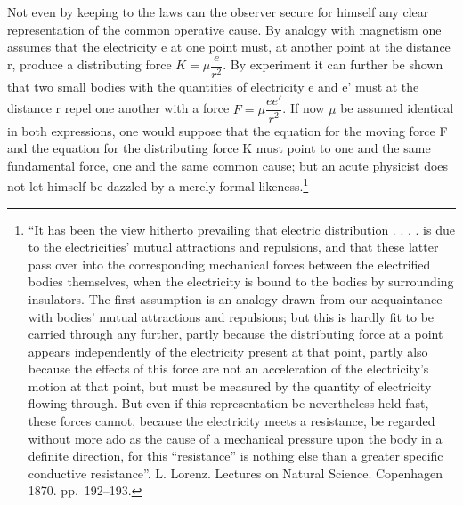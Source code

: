 \documentclass[12pt,a4paper]{book}
\begin{document}
Not even by keeping to the laws can the observer secure for himself any clear representation of the common operative
cause. By analogy with magnetism one assumes that the electricity e at one point must, at another
point at the distance r, produce a distributing force $K = \mu \dfrac{e}{r^{2}}$. By experiment it can further be shown
that two small bodies with the
quantities of electricity e and e' must at the distance r repel one another
with a force $F = \mu \dfrac{ee'}{r^{2}}$. If now $\mu$ be assumed identical in both expressions, one would suppose that
the equation for the moving force F and the equation for the distributing force K must point to one and the same
fundamental force, one and the same common cause; but an acute physicist does not let himself be dazzled by a merely
formal
likeness.\footnote{%
``It has been the view hitherto prevailing that electric
distribution . . . . is due to the electricities' mutual attractions and repulsions, and that these latter pass over into
the corresponding mechanical forces between the electrified bodies themselves, when the electricity is bound to the
bodies by surrounding insulators. The first assumption is an analogy drawn from our acquaintance with bodies' mutual
attractions and repulsions; but this is hardly fit to be carried through any further, partly because the distributing
force at a point appears independently of the electricity present at that point, partly also because the effects of this
force are not an acceleration of the electricity's motion at that point, but must be measured by the quantity of
electricity flowing through. But even if this representation be nevertheless held fast, these forces cannot, because the
electricity meets a resistance, be regarded without more ado as the cause of a mechanical pressure upon the body in a
definite direction, for this ``resistance'' is nothing else than a greater specific conductive resistance''. L. Lorenz.
Lectures on Natural Science. Copenhagen 1870. pp.\ 192--193.}
\end{document}

